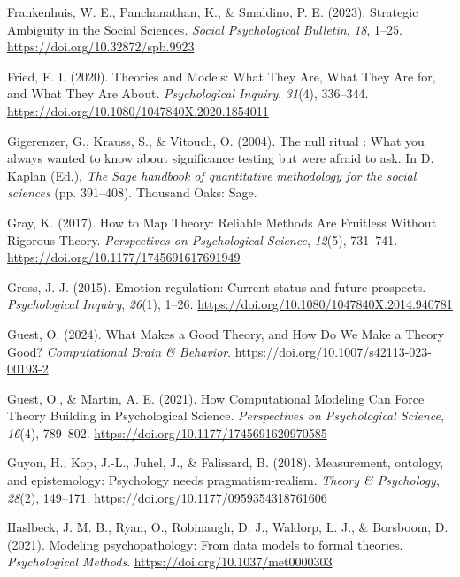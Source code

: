 \documentclass[
  man, noextraspace,floatsintext]{apa6}
\newlength{\cslhangindent}
\newenvironment{CSLReferences}[2] %
 {\begin{list}{}{%
  \setlength{\itemindent}{0pt}
  \setlength{\leftmargin}{0pt}
  \setlength{\parsep}{0pt}
  \ifodd #1
   \setlength{\leftmargin}{\cslhangindent}
   \setlength{\itemindent}{-1\cslhangindent}
  \fi
  \setlength{\itemsep}{#2\baselineskip}}}
 {\end{list}}
\begin{document}
\begin{CSLReferences}{1}{0}
Frankenhuis, W. E., Panchanathan, K., \& Smaldino, P. E. (2023). Strategic {Ambiguity} in the {Social Sciences}. \emph{Social Psychological Bulletin}, \emph{18}, 1--25. \url{https://doi.org/10.32872/spb.9923}

Fried, E. I. (2020). Theories and {Models}: {What They Are}, {What They Are} for, and {What They Are About}. \emph{Psychological Inquiry}, \emph{31}(4), 336--344. \url{https://doi.org/10.1080/1047840X.2020.1854011}

Gigerenzer, G., Krauss, S., \& Vitouch, O. (2004). The null ritual : {What} you always wanted to know about significance testing but were afraid to ask. In D. Kaplan (Ed.), \emph{The {Sage} handbook of quantitative methodology for the social sciences} (pp. 391--408). Thousand Oaks: Sage.

Gray, K. (2017). How to {Map Theory}: {Reliable Methods Are Fruitless Without Rigorous Theory}. \emph{Perspectives on Psychological Science}, \emph{12}(5), 731--741. \url{https://doi.org/10.1177/1745691617691949}

Gross, J. J. (2015). Emotion regulation: {Current} status and future prospects. \emph{Psychological Inquiry}, \emph{26}(1), 1--26. \url{https://doi.org/10.1080/1047840X.2014.940781}

Guest, O. (2024). What {Makes} a {Good Theory}, and {How Do We Make} a {Theory Good}? \emph{Computational Brain \& Behavior}. \url{https://doi.org/10.1007/s42113-023-00193-2}

Guest, O., \& Martin, A. E. (2021). How {Computational Modeling Can Force Theory Building} in {Psychological Science}. \emph{Perspectives on Psychological Science}, \emph{16}(4), 789--802. \url{https://doi.org/10.1177/1745691620970585}

Guyon, H., Kop, J.-L., Juhel, J., \& Falissard, B. (2018). Measurement, ontology, and epistemology: {Psychology} needs pragmatism-realism. \emph{Theory \& Psychology}, \emph{28}(2), 149--171. \url{https://doi.org/10.1177/0959354318761606}

Haslbeck, J. M. B., Ryan, O., Robinaugh, D. J., Waldorp, L. J., \& Borsboom, D. (2021). Modeling psychopathology: {From} data models to formal theories. \emph{Psychological Methods}. \url{https://doi.org/10.1037/met0000303}


\end{CSLReferences}
\end{document}
